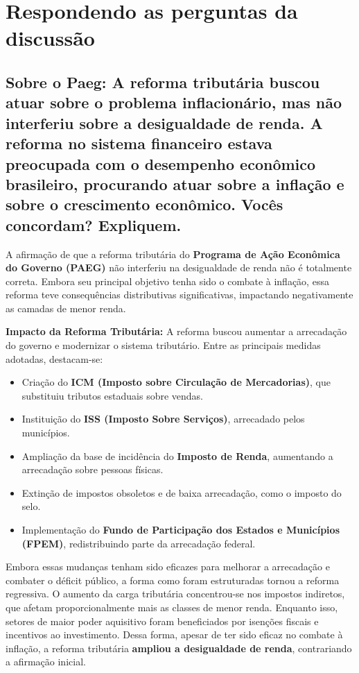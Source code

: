 \documentclass[a4paper,12pt]{article}[abntex2]
\begin{document}
\newpage
\section{\textbf{Respondendo as perguntas da discussão}}
\subsection{\textbf{Sobre o Paeg: A reforma tributária buscou atuar sobre o problema inflacionário, mas não interferiu sobre a desigualdade de renda. A reforma no sistema financeiro estava preocupada com o desempenho econômico brasileiro, procurando atuar sobre a inflação e sobre o crescimento econômico. Vocês concordam? Expliquem.}}

A afirmação de que a reforma tributária do \textbf{Programa de Ação Econômica do Governo (PAEG)} não interferiu na desigualdade de renda não é totalmente correta. Embora seu principal objetivo tenha sido o combate à inflação, essa reforma teve consequências distributivas significativas, impactando negativamente as camadas de menor renda.

\noindent \textbf{Impacto da Reforma Tributária:}  
A reforma buscou aumentar a arrecadação do governo e modernizar o sistema tributário. Entre as principais medidas adotadas, destacam-se:
\begin{itemize}
    \item Criação do \textbf{ICM (Imposto sobre Circulação de Mercadorias)}, que substituiu tributos estaduais sobre vendas.
    \item Instituição do \textbf{ISS (Imposto Sobre Serviços)}, arrecadado pelos municípios.
    \item Ampliação da base de incidência do \textbf{Imposto de Renda}, aumentando a arrecadação sobre pessoas físicas.
    \item Extinção de impostos obsoletos e de baixa arrecadação, como o imposto do selo.
    \item Implementação do \textbf{Fundo de Participação dos Estados e Municípios (FPEM)}, redistribuindo parte da arrecadação federal.
\end{itemize}

Embora essas mudanças tenham sido eficazes para melhorar a arrecadação e combater o déficit público, a forma como foram estruturadas tornou a reforma regressiva. O aumento da carga tributária concentrou-se nos impostos indiretos, que afetam proporcionalmente mais as classes de menor renda. Enquanto isso, setores de maior poder aquisitivo foram beneficiados por isenções fiscais e incentivos ao investimento. Dessa forma, apesar de ter sido eficaz no combate à inflação, a reforma tributária \textbf{ampliou a desigualdade de renda}, contrariando a afirmação inicial.
\end{document}
